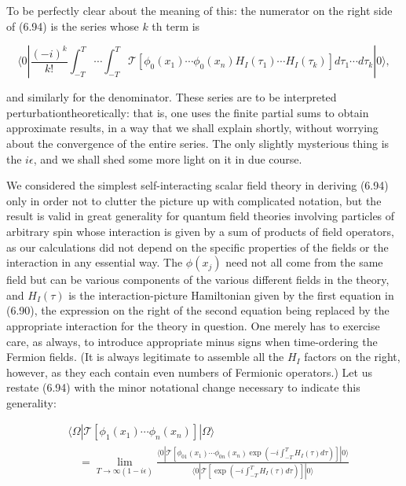\documentclass[10pt, letterpaper]{article}
\begin{document}
To be perfectly clear about the meaning of this: the numerator on the right side of (6.94) is the series whose $k$ th term is

$$
\langle 0| \frac{(-i)^{k}}{k!} \int_{-T}^{T} \cdots \int_{-T}^{T} \mathcal{T}\left[\phi_{0}\left(x_{1}\right) \cdots \phi_{0}\left(x_{n}\right) H_{I}\left(\tau_{1}\right) \cdots H_{I}\left(\tau_{k}\right)\right] d \tau_{1} \cdots d \tau_{k}|0\rangle,
$$

and similarly for the denominator. These series are to be interpreted perturbationtheoretically: that is, one uses the finite partial sums to obtain approximate results, in a way that we shall explain shortly, without worrying about the convergence of the entire series. The only slightly mysterious thing is the $i \epsilon$, and we shall shed some more light on it in due course.

We considered the simplest self-interacting scalar field theory in deriving (6.94) only in order not to clutter the picture up with complicated notation, but the result is valid in great generality for quantum field theories involving particles of arbitrary spin whose interaction is given by a sum of products of field operators, as our calculations did not depend on the specific properties of the fields or the interaction in any essential way. The $\phi\left(x_{j}\right)$ need not all come from the same field but can be various components of the various different fields in the theory, and $H_{I}(\tau)$ is the interaction-picture Hamiltonian given by the first equation in (6.90), the expression on the right of the second equation being replaced by the appropriate interaction for the theory in question. One merely has to exercise care, as always, to introduce appropriate minus signs when time-ordering the Fermion fields. (It is always legitimate to assemble all the $H_{I}$ factors on the right, however, as they each contain even numbers of Fermionic operators.) Let us restate (6.94) with the minor notational change necessary to indicate this generality:

$$
\begin{aligned}
& \langle\Omega| \mathcal{T}\left[\phi_{1}\left(x_{1}\right) \cdots \phi_{n}\left(x_{n}\right)\right]|\Omega\rangle \\
& \quad=\lim _{T \rightarrow \infty(1-i \epsilon)} \frac{\langle 0| \mathcal{T}\left[\phi_{01}\left(x_{1}\right) \cdots \phi_{0 n}\left(x_{n}\right) \exp \left(-i \int_{-T}^{T} H_{I}(\tau) d \tau\right)\right]|0\rangle}{\langle 0| \mathcal{T}\left[\exp \left(-i \int_{-T}^{T} H_{I}(\tau) d \tau\right)\right]|0\rangle}
\end{aligned}
$$
\end{document}
